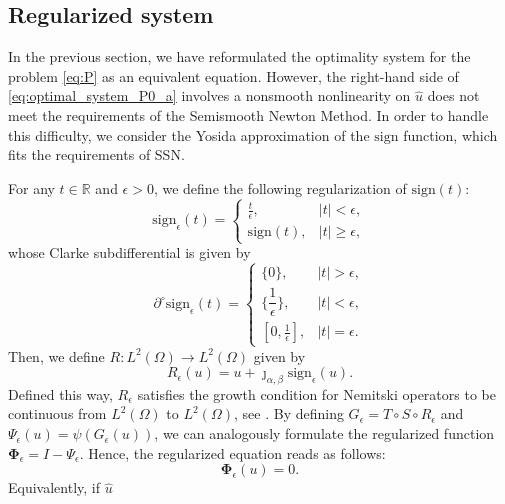 \documentclass[11pt,a4paper]{amsart}
\renewcommand{\l}{\left}
\renewcommand{\r}{\right}
\newcommand{\om}{\Omega}
\newcommand{\sign}{\mathrm{sign}}
\begin{document}
\subsection{Regularized system}
In the previous section, we have reformulated  the optimality system for the problem \eqref{eq:P} as an equivalent equation. However, the right-hand side of \eqref{eq:optimal_system_P0_a} involves a nonsmooth nonlinearity on $\hat u$ does not meet the requirements of the Semismooth Newton Method. In order to handle this difficulty, we consider the Yosida approximation of the $\sign$ function, which fits the requirements of SSN.

For any $t\in\mathbb{R}$ and $\epsilon>0$, we define the following regularization of $\sign(t):$
\begin{equation}\label{eq:singeps}
\sign_{\epsilon}(t)=\begin{cases}
\frac{t}{\epsilon}, & |t|<\epsilon,\\
\sign(t), & |t|\ge \epsilon,\end{cases}
\end{equation}
whose Clarke subdifferential is given by
\begin{equation} \label{eq:csub_signeps}
\partial^\circ\sign_{\epsilon}(t)=\begin{cases}
\{0\}, & |t|>\epsilon,\\
\Big\{\dfrac{1}{\epsilon}\Big\}, & |t|< \epsilon,\\
\l[0,\frac{1}{\epsilon}\r], & |t|=\epsilon.
\end{cases}
\end{equation}
%
Then, we define $R:L^2(\om) \to L^2(\om)$ given by 
\begin{equation}\label{eq:R_eps} 
R_\epsilon(u) = u + \jmath_{\alpha,\beta}\sign_\epsilon(u).
\end{equation}
Defined this way, $R_\epsilon$ satisfies the growth condition for Nemitski operators to be continuous from $L^2(\om)$ to $L^2(\om)$, see \cite{ambro95}. By defining $G_\epsilon=T \circ S \circ R_\epsilon$ and $\Psi_\epsilon(u) = \psi(G_\epsilon(u))$, we can analogously formulate the regularized function $\mathbf{\Phi}_\epsilon=I- \Psi_\epsilon$. Hence, the regularized equation reads as follows:
\begin{equation} \label{eq:Phi_eps=0}
\mathbf{\Phi}_\epsilon(u)=0.
\end{equation}
Equivalently, if $\hat u$
\end{document}
